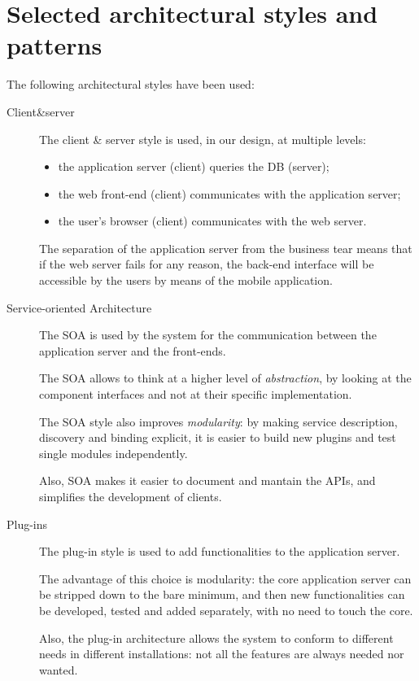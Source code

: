 \section{Selected architectural styles and patterns}
\label{sec:styles-patterns}

The following architectural styles have been used:

\begin{description}
\item[Client\&server]
The client \& server style is used, in our design, at multiple levels:
\begin{itemize}
    \item the application server (client) queries the DB (server);
    \item the web front-end (client) communicates with the application server;
    \item the user's browser (client) communicates with the web server.
\end{itemize}

The separation of the application server from the business tear means that if the web server fails for any reason, the back-end interface will be accessible by the users by means of the mobile application.

\item[Service-oriented Architecture]
The SOA is used by the system for the communication between the application server and the front-ends.

The SOA allows to think at a higher level of \emph{abstraction}, by looking at the component interfaces and not at their specific implementation.

The SOA style also improves \emph{modularity}: by making service description, discovery and binding explicit, it is easier to build new plugins and test single modules independently.

Also, SOA makes it easier to document and mantain the APIs, and simplifies the development of clients.

\item[Plug-ins]
The plug-in style is used to add functionalities to the application server.

The advantage of this choice is modularity: the core application server can be stripped down to the bare minimum, and then new functionalities can be developed, tested and added separately, with no need to touch the core.

Also, the plug-in architecture allows the system to conform to different needs in different installations: not all the features are always needed nor wanted.


\end{description}
